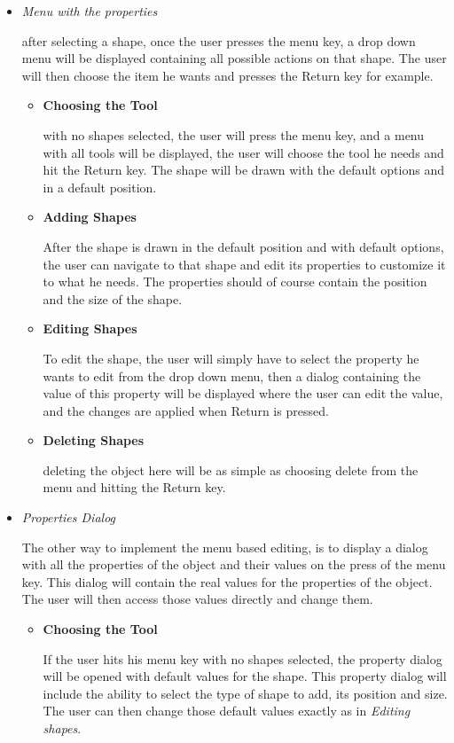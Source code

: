 \begin{itemize}
\item {\it Menu with the properties}
\par \noindent
after selecting a shape, once the user presses the menu key, a drop down menu will be displayed containing all possible actions on that shape. The user will then choose the item he wants and presses  the Return key for example.

	\begin{itemize}
	\item {\bf Choosing the Tool}
	\par \noindent
	with no shapes selected, the user will press the menu key, and a menu with all tools will be displayed, the user will choose the tool he needs and hit the Return key. The shape will be drawn with the default options and in a default position.
	
	\item {\bf Adding Shapes}
	\par \noindent
	After the shape is drawn in the default position and with default options, the user can navigate to that shape and edit its properties to customize it to what he needs. The properties should of course contain the position and the size of the shape.

	\item {\bf Editing Shapes}
	\par \noindent
	To edit the shape, the user will simply have to select the property he wants to edit from the drop down menu, then a dialog containing the value of this property will be displayed where the user can edit the value, and the changes are applied when Return is pressed.

	\item {\bf Deleting Shapes}
	\par \noindent
	deleting the object here will be as simple as choosing delete from the menu and hitting the Return key.
	\end{itemize}

\item {\it Properties Dialog}
\par \noindent
The other way to implement the menu based editing, is to display a dialog with all the properties of the object and their values on the press of the menu key. This dialog will contain the real values for the properties of the object. The user will then access those values directly and change them.

	\begin{itemize}
	\item {\bf Choosing the Tool}
	\par \noindent
	If the user hits his menu key with no shapes selected, the property dialog will be opened with default values for the shape. This property dialog will include the ability to select the type of shape to add, its position and size. The user can then change those default values exactly as in {\it Editing shapes}.


\end{itemize}
\end{itemize}
